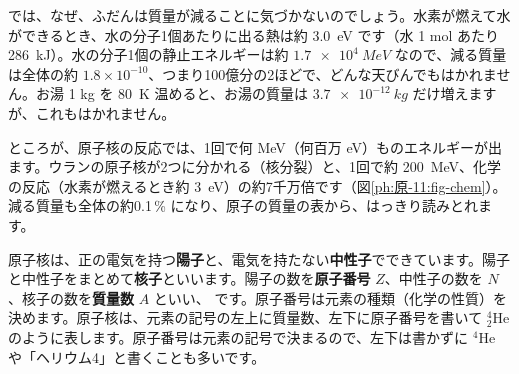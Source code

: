 では、なぜ、ふだんは質量が減ることに気づかないのでしょう。水素が燃えて水ができるとき、水の分子1個あたりに出る熱は約 \qty{3.0}{eV} です（水 1 mol あたり \qty{286}{kJ}）。水の分子1個の静止エネルギーは約 $\qty{1.7e4}{MeV}$ なので、減る質量は全体の約 $1.8\times10^{-10}$、つまり100億分の2ほどで、どんな天びんでもはかれません。お湯 1 kg を \qty{80}{K} 温めると、お湯の質量は $\qty{3.7e-12}{kg}$ だけ増えますが、これもはかれません。

ところが、原子核の反応では、1回で何 MeV（何百万 eV）ものエネルギーが出ます。ウランの原子核が2つに分かれる（核分裂）と、1回で約 \qty{200}{MeV}、化学の反応（水素が燃えるとき約 \qty{3}{eV}）の約7千万倍です（図\ref{ph:原-11:fig-chem}）。減る質量も全体の約0.1\,\% になり、原子の質量の表から、はっきり読みとれます。

\begin{bkfigure}
\label{ph:原-11:fig-chem}
\end{bkfigure}


\label{ph:原-11:sec3}
原子核は、正の電気を持つ\textbf{陽子}と、電気を持たない\textbf{中性子}でできています。陽子と中性子をまとめて\textbf{核子}といいます。陽子の数を\textbf{原子番号} $Z$、中性子の数を $N$、核子の数を\textbf{質量数} $A$ といい、
\label{ph:原-11:nuc}です。原子番号は元素の種類（化学の性質）を決めます。原子核は、元素の記号の左上に質量数、左下に原子番号を書いて ${}^{4}_{2}\mathrm{He}$ のように表します。原子番号は元素の記号で決まるので、左下は書かずに ${}^{4}\mathrm{He}$ や「ヘリウム4」と書くことも多いです。


